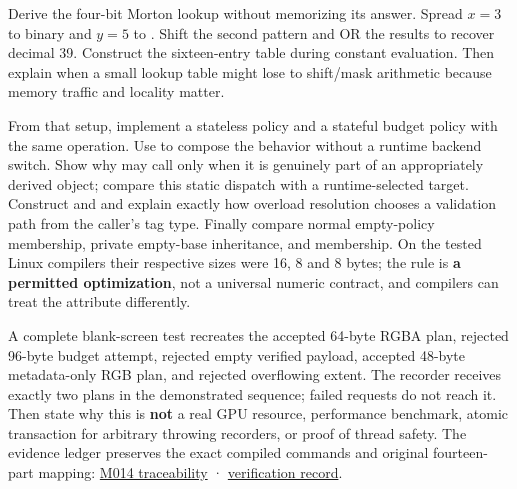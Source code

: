 Derive the four-bit Morton lookup without memorizing its answer. Spread \(x=3\) to binary  and \(y=5\) to . Shift the second pattern and OR the results to recover decimal 39. Construct the sixteen-entry table during constant evaluation. Then explain when a small lookup table might lose to shift/mask arithmetic because memory traffic and locality matter.

From that setup, implement a stateless policy and a stateful budget policy with the same  operation. Use  to compose the behavior without a runtime backend switch. Show why  may call  only when it is genuinely part of an appropriately derived object; compare this static dispatch with a runtime-selected  target. Construct  and  and explain exactly how overload resolution chooses a validation path from the caller's tag type. Finally compare normal empty-policy membership, private empty-base inheritance, and  membership. On the tested Linux compilers their respective sizes were 16, 8 and 8 bytes; the rule is \textbf{a permitted optimization}, not a universal numeric contract, and compilers can treat the attribute differently.

A complete blank-screen test recreates the accepted 64-byte RGBA plan, rejected 96-byte budget attempt, rejected empty verified payload, accepted 48-byte metadata-only RGB plan, and rejected overflowing extent. The recorder receives exactly two plans in the demonstrated sequence; failed requests do not reach it. Then state why this is \textbf{not} a real GPU resource, performance benchmark, atomic transaction for arbitrary throwing recorders, or proof of thread safety. The evidence ledger preserves the exact compiled commands and original fourteen-part mapping: \hyperref[appendix-fd090d982a15-m014-parts-217230-one-tile-planner-and-its-compile-time-policy-decisions]{M014 traceability} · \hyperref[appendix-a103e7846d21-phase-4-additive-reconstruction-m014-parts-217230]{verification record}.

